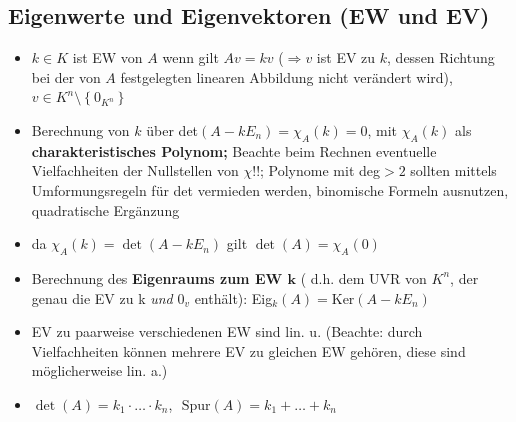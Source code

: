 \documentclass[10pt,a4paper]{article}
\begin{document}
\subsection{Eigenwerte und Eigenvektoren (EW und EV)}
\begin{itemize}
\item $k\in K$ ist EW von $A$ wenn gilt $Av=kv$ ($\Rightarrow v$ ist EV zu $k$, dessen Richtung bei der von $A$ festgelegten linearen Abbildung nicht verändert wird), $v\in K^{n}\setminus \left\lbrace 0_{K^{n}}\right\rbrace$
\item Berechnung von $k$ über det$(A-kE_{n})=\chi_{A}(k)=0$, mit $\chi_{A}(k)$ als \textbf{charakteristisches Polynom;} Beachte beim Rechnen eventuelle Vielfachheiten der Nullstellen von $\chi$!!; Polynome mit deg$>2$ sollten mittels  Umformungsregeln für det vermieden werden, binomische Formeln ausnutzen, quadratische Ergänzung
\item da $\chi_{A}(k)=\det (A-kE_{n})$ gilt $\det(A)=\chi_{A}(0)$
\item Berechnung des \textbf{Eigenraums zum EW $\boldsymbol{k}$} ( d.h. dem UVR von $K^{n}$, der genau die EV zu k \textit{und} $0_{v}$ enthält): Eig$_{k}(A)=\text{Ker}(A-kE_{n})$
\item EV zu paarweise verschiedenen EW sind lin. u. (Beachte: durch Vielfachheiten können mehrere EV zu gleichen EW gehören, diese sind möglicherweise lin. a.)
\item $\det(A)=k_{1}\cdot \dotsc \cdot k_{n}$, $\text{ Spur}(A)=k_{1}+\dotsc +k_{n}$
\end{itemize}
\end{document}
